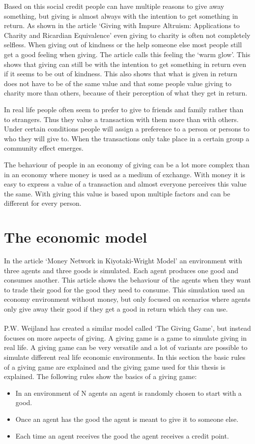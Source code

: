 \documentclass[twoside,openright]{uva-bachelor-thesis}
\begin{document}
Based on this social credit people can have multiple reasons to give away something, but giving is almost always with the intention to get something in return. As shown in the article ‘Giving with Impure Altruism: Applications to Charity and Ricardian Equivalence’ even giving to charity is often not completely selfless. When giving out of kindness or the help someone else most people still get a good feeling when giving. The article calls this feeling the ‘warm glow’. This shows that giving can still be with the intention to get something in return even if it seems to be out of kindness. This also shows that what is given in return does not have to be of the same value and that some people value giving to charity more than others, because of their perception of what they get in return.

In real life people often seem to prefer to give to friends and family rather than to strangers. Thus they value a transaction with them more than with others. Under certain conditions people will assign a preference to a person or persons to who they will give to. When the transactions only take place in a certain group a community effect emerges.

The behaviour of people in an economy of giving can be a lot more complex than in an economy where money is used as a medium of exchange. With money it is easy to express a value of a transaction and almost everyone perceives this value the same. With giving this value is based upon multiple factors and can be different for every person.



\section{The economic model}
In the article ‘Money Network in Kiyotaki-Wright Model’ an environment with three agents and three goods is simulated. Each agent produces one good and consumes another. This article shows the behaviour of the agents when they want to trade their good for the good they need to consume. This simulation used an economy environment without money, but only focused on scenarios where agents only give away their good if they get a good in return which they can use. 
\\
\\
P.W. Weijland has created a similar model called ‘The Giving Game’, but instead focuses on more aspects of giving. A giving game is a game to simulate giving in real life. A giving game can be very versatile and a lot of variants are possible to simulate different real life economic environments. In this section the basic rules of a giving game are explained and the giving game used for this thesis is explained.
The following rules show the basics of a giving game:
\begin{itemize}
  \item In an environment of N agents an agent is randomly chosen to start with a good.
  \item Once an agent has the good the agent is meant to give it to someone else.
  \item Each time an agent receives the good the agent receives a credit point.
\end{itemize}
\end{document}
